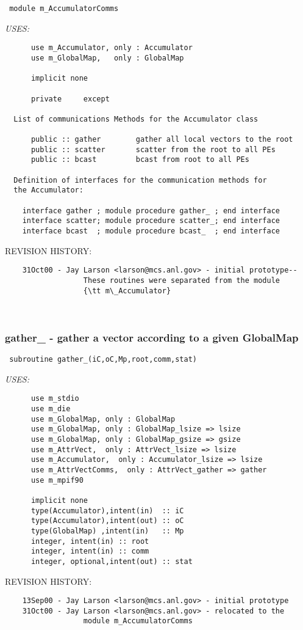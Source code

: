 \begin{verbatim} 
 module m_AccumulatorComms\end{verbatim}{\em USES:}
\begin{verbatim}      use m_Accumulator, only : Accumulator
      use m_GlobalMap,   only : GlobalMap
 
      implicit none
 
      private	  except
 
  List of communications Methods for the Accumulator class
 
      public :: gather		  gather all local vectors to the root
      public :: scatter		  scatter from the root to all PEs
      public :: bcast		  bcast from root to all PEs
 
  Definition of interfaces for the communication methods for 
  the Accumulator:
 
    interface gather ; module procedure gather_ ; end interface
    interface scatter; module procedure scatter_; end interface
    interface bcast  ; module procedure bcast_  ; end interface
 \end{verbatim}{\sf REVISION HISTORY:}
\begin{verbatim}  	31Oct00 - Jay Larson <larson@mcs.anl.gov> - initial prototype--
                  These routines were separated from the module 
                  {\tt m\_Accumulator}\end{verbatim}
 
 
\mbox{}\hrulefill\ 
 

 \subsubsection{gather\_ - gather a vector according to a given GlobalMap}


 
 
\begin{verbatim} 
 subroutine gather_(iC,oC,Mp,root,comm,stat)\end{verbatim}{\em USES:}
\begin{verbatim}      use m_stdio
      use m_die
      use m_GlobalMap, only : GlobalMap
      use m_GlobalMap, only : GlobalMap_lsize => lsize
      use m_GlobalMap, only : GlobalMap_gsize => gsize
      use m_AttrVect,  only : AttrVect_lsize => lsize
      use m_Accumulator,  only : Accumulator_lsize => lsize
      use m_AttrVectComms,  only : AttrVect_gather => gather
      use m_mpif90
 
      implicit none
      type(Accumulator),intent(in)  :: iC
      type(Accumulator),intent(out) :: oC
      type(GlobalMap) ,intent(in)   :: Mp
      integer, intent(in) :: root
      integer, intent(in) :: comm
      integer, optional,intent(out) :: stat
 \end{verbatim}{\sf REVISION HISTORY:}
\begin{verbatim}  	13Sep00 - Jay Larson <larson@mcs.anl.gov> - initial prototype
  	31Oct00 - Jay Larson <larson@mcs.anl.gov> - relocated to the
                  module m_AccumulatorComms\end{verbatim}
 
